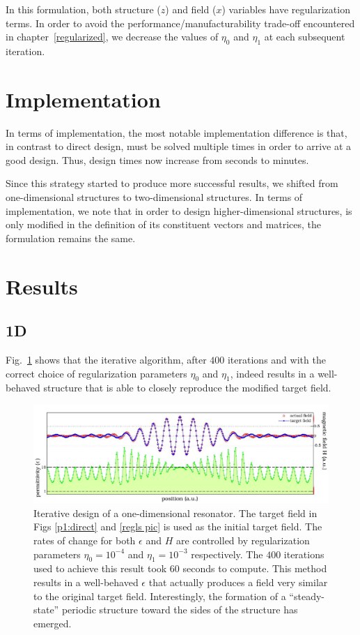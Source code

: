 In this formulation, both structure ($z$) and field ($x$) variables
    have regularization terms.
In order to avoid the performance/manufacturability trade-off 
    encountered in chapter~\ref{regularized},
    we decrease the values of $\eta_0$ and $\eta_1$ at each subsequent iteration.

\section{Implementation}
In terms of implementation,
    the most notable implementation difference is that,
    in contrast to direct design,
     must be solved multiple times
    in order to arrive at a good design.
Thus, design times now increase from seconds to minutes.

Since this strategy started to produce more successful results,
    we shifted from one-dimensional structures to two-dimensional structures.
In terms of implementation, we note that 
    in order to design higher-dimensional structures,
     is only modified in the
    definition of its constituent vectors and matrices,
    the formulation remains the same.


\section{Results}
\subsection{1D}
Fig.~\ref{comp pic} shows that the iterative algorithm, after $400$ iterations and with the correct choice of regularization parameters $\eta_0$ and $\eta_1$, 
    indeed results in a well-behaved structure that is able to closely reproduce the modified target field\cite{Lu10}.

\begin{figure}[htbp]\centering
\includegraphics[width=\textwidth]{p1/complementary}
\caption{Iterative design of a one-dimensional resonator. 
    The target field in Figs \ref{p1:direct} and \ref{regls pic} is used as the initial target field. The rates of change for both $\epsilon$ and $H$ are controlled by regularization parameters $\eta_0=10^{-4}$ and $\eta_1=10^{-3}$ respectively. The $400$ iterations used to achieve this result took $60$ seconds to compute. This method results in a well-behaved $\epsilon$ that actually produces a field very similar to the original target field. Interestingly, the formation of a ``steady-state'' periodic structure toward the sides of the structure has emerged.}
\label{comp pic}
\end{figure}

